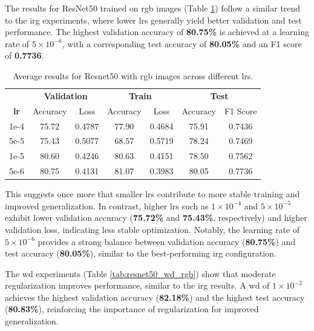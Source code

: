 The results for ResNet50 trained on \gls{rgb} images (Table \ref{tab:resnet50_rgb}) 
follow a similar trend to the \gls{irg} experiments, where lower \glspl{lr} 
generally yield better validation and test performance. The highest validation 
accuracy of \textbf{80.75\%} is achieved at a learning rate of $5\times10^{-6}$, with a 
corresponding test accuracy of \textbf{80.05\%} and an F1 score of \textbf{0.7736}. 

\begin{table}[h]
    \centering
    \renewcommand{\arraystretch}{1.3}
    \setlength{\tabcolsep}{8pt}
    \begin{tabular}{|c|cccccc|}
        \hline
        & \multicolumn{2}{c}{\textbf{Validation}} & \multicolumn{2}{c}{\textbf{Train}} & \multicolumn{2}{c|}{\textbf{Test}} \\
        \textbf{\gls{lr}} & Accuracy & Loss & Accuracy & Loss & Accuracy & F1 Score \\
        \hline
        1e-4 & 75.72 & 0.4787 & 77.90 & 0.4684 & 75.91 & 0.7436 \\
        5e-5 & 75.43 & 0.5077 & 68.57 & 0.5719 & 78.24 & 0.7469 \\
        1e-5 & 80.60 & 0.4246 & 80.63 & 0.4151 & 78.50 & 0.7562 \\
        5e-6 & 80.75 & 0.4131 & 81.07 & 0.3983 & 80.05 & 0.7736 \\
        \hline
    \end{tabular}
    \caption{Average results for Resnet50 with \gls{rgb} images across different \glspl{lr}.}
    \label{tab:resnet50_rgb}
\end{table}

This suggests once more that smaller \glspl{lr} contribute to more stable training and improved 
generalization. In contrast, higher \glspl{lr} such as $1\times10^{-4}$ and 
$5\times10^{-5}$ exhibit lower validation accuracy (\textbf{75.72\%} and \textbf{75.43\%}, respectively) 
and higher validation loss, indicating less stable optimization. Notably, the learning 
rate of $5\times10^{-6}$ provides a strong balance between validation accuracy (\textbf{80.75\%}) 
and test accuracy (\textbf{80.05\%}), similar to the best-performing \gls{irg} configuration.

The \gls{wd} experiments (Table \ref{tab:resnet50_wd_rgb}) show that moderate 
regularization improves performance, similar to the \gls{irg} results. A \gls{wd} of 
$1\times10^{-2}$ achieves the highest validation accuracy (\textbf{82.18\%}) and the highest test accuracy 
(\textbf{80.83\%}), reinforcing the importance of regularization for improved generalization. 

